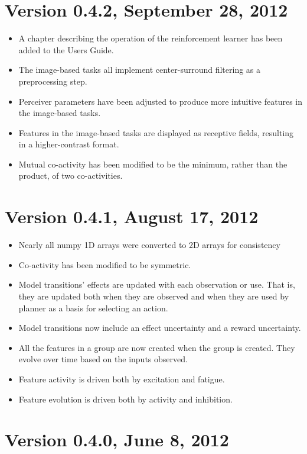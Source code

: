 \section*{Version 0.4.2, September 28, 2012}

\begin{itemize}
\item A chapter describing the operation of the reinforcement learner has been added to the Users Guide.
\item The image-based tasks all implement center-surround filtering as a preprocessing step.
\item Perceiver parameters have been adjusted to produce more intuitive features in the image-based tasks.
\item Features in the image-based tasks are displayed as receptive fields, resulting in a higher-contrast format.
\item Mutual co-activity has been modified to be the minimum, rather than the product, of two co-activities.
\end{itemize}


\section*{Version 0.4.1, August 17, 2012}

\begin{itemize}
\item Nearly all numpy 1D arrays were converted to 2D arrays for consistency   
\item Co-activity has been modified to be symmetric.
\item Model transitions' effects are updated with each observation or use. That is, they are updated both when they are observed and when they are used by planner as a basis for selecting an action.
\item Model transitions now include an effect uncertainty and a reward uncertainty. 
\item All the features in a group are now created when the group is created. They evolve over time based on the inputs observed.
\item Feature activity is driven both by excitation and fatigue.
\item Feature evolution is driven both by activity and inhibition.
\end{itemize}


\section*{Version 0.4.0, June 8, 2012}

